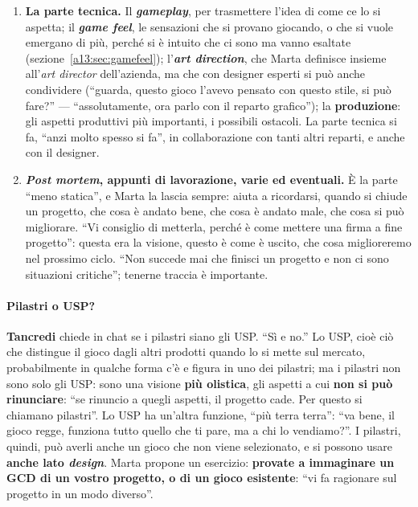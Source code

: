 \begin{enumerate}
        \textbf{USP}, \emph{Unique Selling Point}, o \emph{key selling point}, gli aspetti
        che rendono il gioco vendibile ``nel senso più vero del termine''; i
        \textbf{\emph{competitor}}, e anche qui conoscere il mercato è importante.
  \item \textbf{La parte tecnica.} Il \textbf{\emph{gameplay}}, per trasmettere l'idea di
        come ce lo si aspetta; il \textbf{\emph{game feel}}, le sensazioni che si provano
        giocando, o che si vuole emergano di più, perché si è intuito che ci sono ma vanno
        esaltate (sezione~\ref{a13:sec:gamefeel}); l'\textbf{\emph{art direction}}, che Marta
        definisce insieme all'\emph{art director} dell'azienda, ma che con designer esperti
        si può anche condividere (``guarda, questo gioco l'avevo pensato con questo stile,
        si può fare?'' --- ``assolutamente, ora parlo con il reparto grafico''); la
        \textbf{produzione}: gli aspetti produttivi più importanti, i possibili ostacoli.
        La parte tecnica si fa, ``anzi molto spesso si fa'', in collaborazione con tanti
        altri reparti, e anche con il designer.
  \item \textbf{\emph{Post mortem}, appunti di lavorazione, varie ed eventuali.} È la parte
        ``meno statica'', e Marta la lascia sempre: aiuta a ricordarsi, quando si chiude un
        progetto, che cosa è andato bene, che cosa è andato male, che cosa si può
        migliorare. ``Vi consiglio di metterla, perché è come mettere una firma a fine
        progetto'': questa era la visione, questo è come è uscito, che cosa miglioreremo
        nel prossimo ciclo. ``Non succede mai che finisci un progetto e non ci sono
        situazioni critiche''; tenerne traccia è importante.
\end{enumerate}

\paragraph{Pilastri o USP?} \textbf{Tancredi} chiede in chat se i pilastri siano gli USP.
``Sì e no.'' Lo USP, cioè ciò che distingue il gioco dagli altri prodotti quando lo si
mette sul mercato, probabilmente in qualche forma c'è e figura in uno dei pilastri; ma i
pilastri non sono solo gli USP: sono una visione \textbf{più olistica}, gli aspetti a cui
\textbf{non si può rinunciare}: ``se rinuncio a quegli aspetti, il progetto cade. Per
questo si chiamano pilastri''. Lo USP ha un'altra funzione, ``più terra terra'': ``va bene,
il gioco regge, funziona tutto quello che ti pare, ma a chi lo vendiamo?''. I pilastri,
quindi, può averli anche un gioco che non viene selezionato, e si possono usare
\textbf{anche lato \emph{design}}. Marta propone un esercizio: \textbf{provate a immaginare
un GCD di un vostro progetto, o di un gioco esistente}: ``vi fa ragionare sul progetto in
un modo diverso''.

